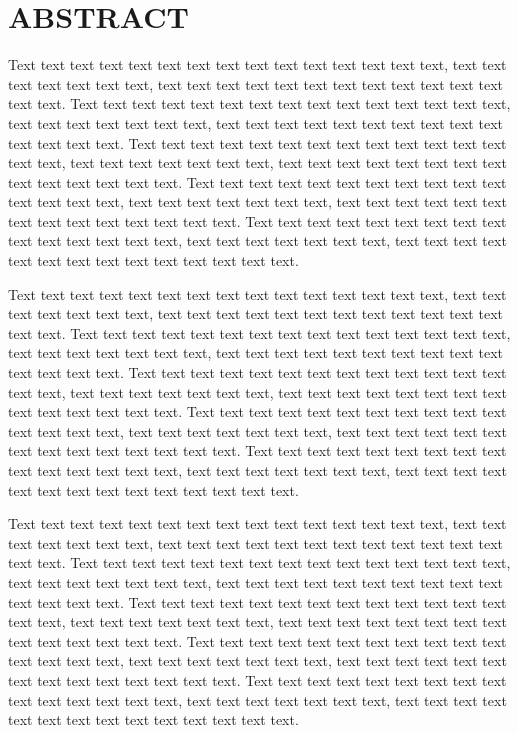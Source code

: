 \chapter*{\bfseries ABSTRACT}
\vspace*{0.5\baselineskip}

Text text text text text text text text text text text text text text text, text text text text text text text, text text text text text text text text text text text text text text. Text text text text text text text text text text text text text text text, text text text text text text text, text text text text text text text text text text text text text text. Text text text text text text text text text text text text text text text, text text text text text text text, text text text text text text text text text text text text text text. Text text text text text text text text text text text text text text text, text text text text text text text, text text text text text text text text text text text text text text. Text text text text text text text text text text text text text text text, text text text text text text text, text text text text text text text text text text text text text text.

Text text text text text text text text text text text text text text text, text text text text text text text, text text text text text text text text text text text text text text. Text text text text text text text text text text text text text text text, text text text text text text text, text text text text text text text text text text text text text text. Text text text text text text text text text text text text text text text, text text text text text text text, text text text text text text text text text text text text text text. Text text text text text text text text text text text text text text text, text text text text text text text, text text text text text text text text text text text text text text. Text text text text text text text text text text text text text text text, text text text text text text text, text text text text text text text text text text text text text text.

Text text text text text text text text text text text text text text text, text text text text text text text, text text text text text text text text text text text text text text. Text text text text text text text text text text text text text text text, text text text text text text text, text text text text text text text text text text text text text text. Text text text text text text text text text text text text text text text, text text text text text text text, text text text text text text text text text text text text text text. Text text text text text text text text text text text text text text text, text text text text text text text, text text text text text text text text text text text text text text. Text text text text text text text text text text text text text text text, text text text text text text text, text text text text text text text text text text text text text text.

